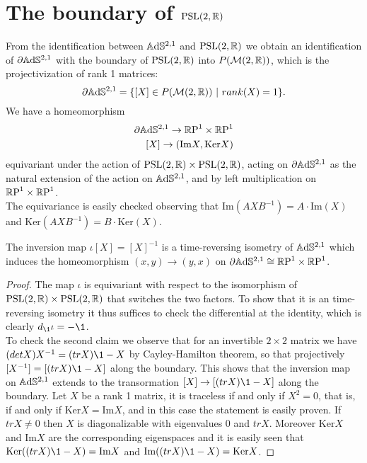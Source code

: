 \section{The boundary of $\text{PSL}(2,\mathbb{R})$}
From the identification between $\mathbb{A}\mathrm{d}\mathbb{S}^{2,1}$ and $\text{PSL}(2,\mathbb{R})$ we obtain an identification of $\partial \mathbb{A}\mathrm{d}\mathbb{S}^{2,1}$ with the boundary of $\text{PSL}(2,\mathbb{R})$ into $P(\mathcal{M}(2,\mathbb{R}))$, which is the projectivization of rank 1 matrices:
\[
    \partial \mathbb{A}\mathrm{d}\mathbb{S}^{2,1} = \{ [X] \in P(\mathcal{M}(2,\mathbb{R})) \ | \ rank(X)=1 \}.
\]
We have a homeomorphism
\begin{align*}
    \partial \mathbb{A}\mathrm{d}\mathbb{S}^{2,1} \to \mathbb{R}\text{P}^1\times\mathbb{R}\text{P}^1 \\
    [X] \to (\text{Im}X, \text{Ker}X)
\end{align*}
equivariant under the action of $\text{PSL}(2,\mathbb{R}) \times \text{PSL}(2,\mathbb{R})$, acting on $\partial\mathbb{A}\mathrm{d}\mathbb{S}^{2,1}$ as the natural extension of the action on $\mathbb{A}\mathrm{d}\mathbb{S}^{2,1}$, and by left multiplication on $\mathbb{R}\text{P}^1\times\mathbb{R}\text{P}^1$.\\
The equivariance is easily checked observing that $\text{Im}(AXB^{-1}) = A \cdot \text{Im}(X)$ and $\text{Ker}(AXB^{-1}) = B \cdot \text{Ker}(X)$.
\begin{lemma}\label{lem:inversion}
    The inversion map $\iota [X] = [X]^{-1}$ is a time-reversing isometry of $\mathbb{A}\mathrm{d}\mathbb{S}^{2,1}$ which induces the homeomorphism $(x,y) \to (y,x)$ on $\partial \mathbb{A}\mathrm{d}\mathbb{S}^{2,1} \cong \mathbb{R}\text{P}^1\times\mathbb{R}\text{P}^1$.
\end{lemma}
\begin{proof}
    The map $\iota$ is equivariant with respect to the isomorphism of $\text{PSL}(2,\mathbb{R}) \times \text{PSL}(2,\mathbb{R})$ that switches the two factors.
    To show that it is an time-reversing isometry it thus suffices to check the differential at the identity, which is clearly $d_\1 \iota = -\1$.\\
    To check the second claim we observe that for an invertible $2 \times 2$ matrix we have $(detX)X^{-1} = (trX)\1 - X$ by Cayley-Hamilton theorem, so that projectively $[X^{-1}]=[(trX) \1 - X]$ along the boundary.
    This shows that the inversion map on $\mathbb{A}\mathrm{d}\mathbb{S}^{2,1}$ extends to the transormation $[X] \to [(trX)\1 - X]$ along the boundary.
    Let $X$ be a rank 1 matrix, it is traceless if and only if $X^2 =0$, that is, if and only if $\text{Ker}X=\text{Im}X$, and in this case the statement is easily proven.
    If $trX \neq 0$ then $X$ is diagonalizable with eigenvalues $0$ and $trX$. Moreover $\text{Ker}X$ and $\text{Im}X$ are the corresponding eigenspaces and it is easily seen that $\text{Ker}((trX)\1 -X) = \text{Im}X$ and $\text{Im}((trX)\1 -X) = \text{Ker}X$.
\end{proof}

